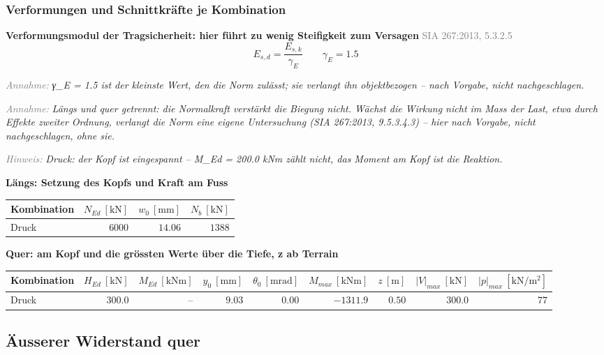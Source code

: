 \documentclass[11pt,a4paper]{article}
\newcommand{\normref}[1]{{\small\textcolor{gray}{#1}}}
\newcommand{\hinweis}[2]{\par\noindent\textcolor{gray}{\textit{#1:}} \textit{#2}\par}
\begin{document}
\subsubsection{Verformungen und Schnittkräfte je Kombination}
\noindent\textbf{Verformungsmodul der Tragsicherheit: hier führt zu wenig Steifigkeit zum Versagen} \hfill \normref{SIA 267:2013, 5.3.2.5}
\begin{equation*}
E_{s,d} = \frac{E_{s,k}}{\gamma_E} \qquad \gamma_E = 1.5
\end{equation*}
\hinweis{Annahme}{γ\_E = 1.5 ist der kleinste Wert, den die Norm zulässt; sie verlangt ihn objektbezogen -- nach Vorgabe, nicht nachgeschlagen.}
\hinweis{Annahme}{Längs und quer getrennt: die Normalkraft verstärkt die Biegung nicht. Wächst die Wirkung nicht im Mass der Last, etwa durch Effekte zweiter Ordnung, verlangt die Norm eine eigene Untersuchung (SIA 267:2013, 9.5.3.4.3) -- hier nach Vorgabe, nicht nachgeschlagen, ohne sie.}
\hinweis{Hinweis}{Druck: der Kopf ist eingespannt -- M\_Ed = 200.0 kNm zählt nicht, das Moment am Kopf ist die Reaktion.}
\noindent\textbf{Längs: Setzung des Kopfs und Kraft am Fuss}
\begin{longtable}{lrrr}
\hline
Kombination & $N_{Ed}\ [\mathrm{kN}]$ & $w_0\ [\mathrm{mm}]$ & $N_b\ [\mathrm{kN}]$ \\
\hline
\endhead
Druck & $6000$ & $14.06$ & $1388$ \\
\hline
\end{longtable}
\noindent\textbf{Quer: am Kopf und die grössten Werte über die Tiefe, z ab Terrain}
\begin{longtable}{lrrrrrrrr}
\hline
Kombination & $H_{Ed}\ [\mathrm{kN}]$ & $M_{Ed}\ [\mathrm{kNm}]$ & $y_0\ [\mathrm{mm}]$ & $\theta_0\ [\mathrm{mrad}]$ & $M_{max}\ [\mathrm{kNm}]$ & $z\ [\mathrm{m}]$ & $|V|_{max}\ [\mathrm{kN}]$ & $|p|_{max}\ [\mathrm{kN/m^2}]$ \\
\hline
\endhead
Druck & $300.0$ & – & $9.03$ & $0.00$ & $-1311.9$ & $0.50$ & $300.0$ & $77$ \\
\hline
\end{longtable}
\subsection{Äusserer Widerstand quer}
\end{document}
